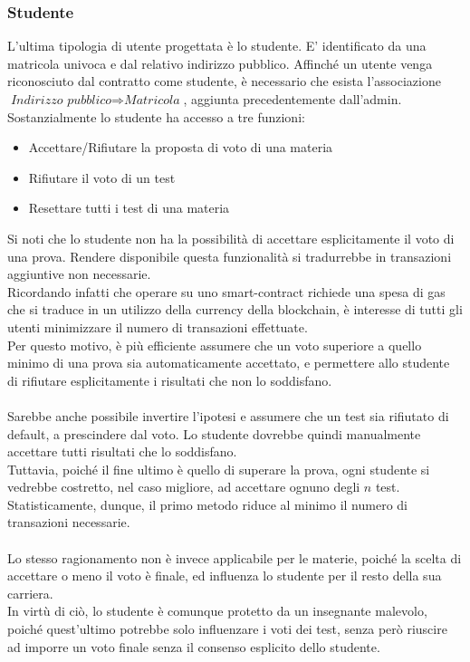 \pagebreak

\subsubsection{Studente}
L'ultima tipologia di utente progettata è lo studente. E' identificato da una matricola univoca e dal relativo indirizzo pubblico. Affinché un utente venga riconosciuto dal contratto come studente, è necessario che esista l'associazione $\textit{Indirizzo pubblico} \Rightarrow \textit{Matricola}$, aggiunta precedentemente dall'admin.
Sostanzialmente lo studente ha accesso a tre funzioni:
\begin{itemize}
    \item Accettare/Rifiutare la proposta di voto di una materia
    \item Rifiutare il voto di un test
    \item Resettare tutti i test di una materia
\end{itemize}

Si noti che lo studente non ha la possibilità di accettare esplicitamente il voto di una prova.
Rendere disponibile questa funzionalità si tradurrebbe in transazioni aggiuntive non necessarie. \\
Ricordando infatti che operare su uno \gls{smart-contract} richiede una spesa di gas che si traduce in un utilizzo della currency della blockchain,
è interesse di tutti gli utenti minimizzare il numero di transazioni effettuate. \\
Per questo motivo, è più efficiente assumere che un voto superiore a quello minimo di una prova sia automaticamente accettato,
e permettere allo studente di rifiutare esplicitamente i risultati che non lo soddisfano. \\
\\
Sarebbe anche possibile invertire l'ipotesi e assumere che un test sia rifiutato di default, a prescindere dal voto.
Lo studente dovrebbe quindi manualmente accettare tutti risultati che lo soddisfano. \\
Tuttavia, poiché il fine ultimo è quello di superare la prova, ogni studente si vedrebbe costretto,
nel caso migliore, ad accettare ognuno degli $n$ test. \\
Statisticamente, dunque, il primo metodo riduce al minimo il numero di transazioni necessarie. \\
\\
Lo stesso ragionamento non è invece applicabile per le materie, poiché la scelta di accettare o meno il voto è finale,
ed influenza lo studente per il resto della sua carriera. \\
In virtù di ciò, lo studente è comunque protetto da un insegnante malevolo, poiché quest'ultimo potrebbe solo influenzare
i voti dei test, senza però riuscire ad imporre un voto finale senza il consenso esplicito dello studente.

